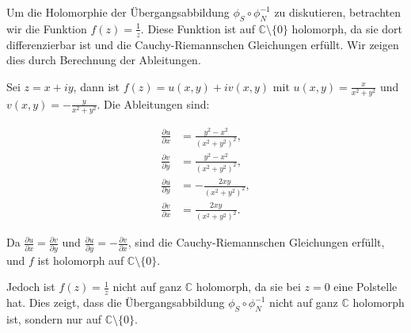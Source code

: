 Um die Holomorphie der Übergangsabbildung $\phi_S \circ \phi_N^{-1}$ zu diskutieren, betrachten wir die Funktion $f(z) = \frac{1}{z}$. Diese Funktion ist auf $\mathbb{C} \setminus \{0\}$ holomorph, da sie dort differenzierbar ist und die Cauchy-Riemannschen Gleichungen erfüllt. Wir zeigen dies durch Berechnung der Ableitungen.

Sei $z = x + iy$, dann ist $f(z) = u(x, y) + iv(x, y)$ mit $u(x, y) = \frac{x}{x^2 + y^2}$ und $v(x, y) = -\frac{y}{x^2 + y^2}$. Die Ableitungen sind:

\begin{align*}
\frac{\partial u}{\partial x} &= \frac{y^2 - x^2}{(x^2 + y^2)^2}, \\
\frac{\partial v}{\partial y} &= \frac{y^2 - x^2}{(x^2 + y^2)^2}, \\
\frac{\partial u}{\partial y} &= -\frac{2xy}{(x^2 + y^2)^2}, \\
\frac{\partial v}{\partial x} &= \frac{2xy}{(x^2 + y^2)^2}.
\end{align*}

Da $\frac{\partial u}{\partial x} = \frac{\partial v}{\partial y}$ und $\frac{\partial u}{\partial y} = -\frac{\partial v}{\partial x}$, sind die Cauchy-Riemannschen Gleichungen erfüllt, und $f$ ist holomorph auf $\mathbb{C} \setminus \{0\}$.

Jedoch ist $f(z) = \frac{1}{z}$ nicht auf ganz $\mathbb{C}$ holomorph, da sie bei $z=0$ eine Polstelle hat. Dies zeigt, dass die Übergangsabbildung $\phi_S \circ \phi_N^{-1}$ nicht auf ganz $\mathbb{C}$ holomorph ist, sondern nur auf $\mathbb{C} \setminus \{0\}$.

